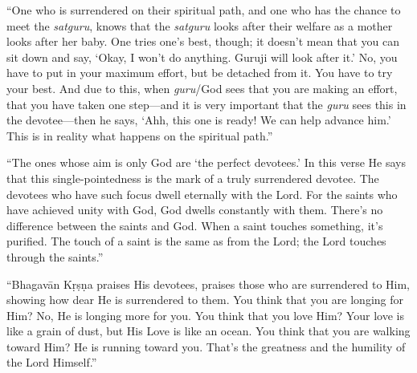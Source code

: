 \enquote{One who is surrendered on their spiritual path, and one who has the chance to meet the \textit{satguru}, knows that the \textit{satguru} looks after their welfare as a mother looks after her baby. One tries one’s best, though; it doesn’t mean that you can sit down and say, \enquote{Okay, I won’t do anything. Guruji will look after it.} No, you have to put in your maximum effort, but be detached from it. You have to try your best. And due to this, when \textit{guru}/God sees that you are making an effort, that you have taken one step---and it is very important that the \textit{guru} sees this in the devotee---then he says, \enquote{Ahh, this one is ready! We can help advance him.} This is in reality what happens on the spiritual path.}

\enquote{The ones whose aim is only God are \enquote{the perfect devotees.} In this verse He says that this single-pointedness is the mark of a truly surrendered devotee. The devotees who have such focus dwell eternally with the Lord. For the saints who have achieved unity with God, God dwells constantly with them. There’s no difference between the saints and God. When a saint touches something, it’s purified. The touch of a saint is the same as from the Lord; the Lord touches through the saints.}

\enquote{Bhagavān Kṛṣṇa praises His devotees, praises those who are surrendered to Him, showing how dear He is surrendered to them. You think that you are longing for Him? No, He is longing more for you. You think that you love Him? Your love is like a grain of dust, but His Love is like an ocean. You think that you are walking toward Him? He is running toward you. That’s the greatness and the humility of the Lord Himself.}
